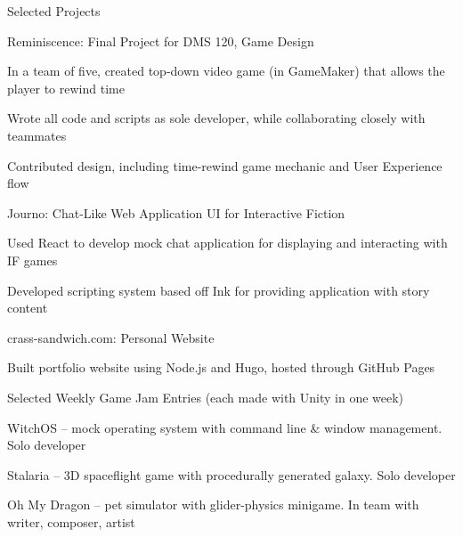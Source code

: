 \documentclass{resume} %
\begin{document}
\begin{rSection}{Selected Projects}

\begin{rProject}{Reminiscence: Final Project for DMS 120, Game Design}
\item In a team of five, created top-down video game (in GameMaker) that allows the player to rewind time
\item Wrote all code and scripts as sole developer, while collaborating closely with teammates
\item Contributed design, including time-rewind game mechanic and User Experience flow
\end{rProject}

\begin{rProject}{Journo: Chat-Like Web Application UI for Interactive Fiction}
\item Used React to develop mock chat application for displaying and interacting with IF games
\item Developed scripting system based off Ink for providing application with story content
\end{rProject}

\begin{rProject}{crass-sandwich.com: Personal Website}
\item Built portfolio website using Node.js and Hugo, hosted through GitHub Pages
\end{rProject}

\begin{rProject}{Selected Weekly Game Jam Entries (each made with Unity in one week)}
\item WitchOS – mock operating system with command line \& window management. Solo developer
\item Stalaria – 3D spaceflight game with procedurally generated galaxy. Solo developer
\item Oh My Dragon – pet simulator with glider-physics minigame. In team with writer, composer, artist
\end{rProject}
\end{rSection}
\end{document}
